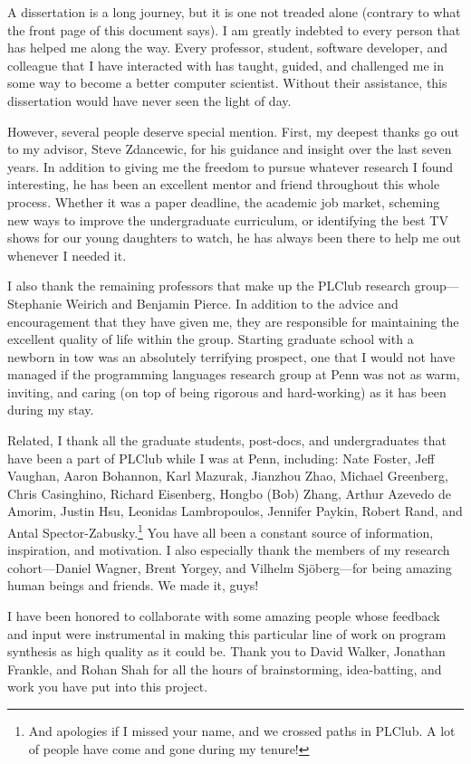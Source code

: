 A dissertation is a long journey, but it is one not treaded alone (contrary to what the front page of this document says).
I am greatly indebted to every person that has helped me along the way.
Every professor, student, software developer, and colleague that I have interacted with has taught, guided, and challenged me in some way to become a better computer scientist.
Without their assistance, this dissertation would have never seen the light of day.

However, several people deserve special mention.
First, my deepest thanks go out to my advisor, Steve Zdancewic, for his guidance and insight over the last seven years.
In addition to giving me the freedom to pursue whatever research I found interesting, he has been an excellent mentor and friend throughout this whole process.
Whether it was a paper deadline, the academic job market, scheming new ways to improve the undergraduate curriculum, or identifying the best TV shows for our young daughters to watch, he has always been there to help me out whenever I needed it.

I also thank the remaining professors that make up the PLClub research group---Stephanie Weirich and Benjamin Pierce.
In addition to the advice and encouragement that they have given me, they are responsible for maintaining the excellent quality of life within the group.
Starting graduate school with a newborn in tow was an absolutely terrifying prospect, one that I would not have managed if the programming languages research group at Penn was not as warm, inviting, and caring (on top of being rigorous and hard-working) as it has been during my stay.

Related, I thank all the graduate students, post-docs, and undergraduates that have been a part of PLClub while I was at Penn, including: Nate Foster, Jeff Vaughan, Aaron Bohannon, Karl Mazurak, Jianzhou Zhao, Michael Greenberg, Chris Casinghino, Richard Eisenberg, Hongbo (Bob) Zhang, Arthur Azevedo de Amorim, Justin Hsu, Leonidas Lambropoulos, Jennifer Paykin, Robert Rand, and Antal Spector-Zabusky.\footnote{%
  And apologies if I missed your name, and we crossed paths in PLClub.
  A lot of people have come and gone during my tenure!
}
You have all been a constant source of information, inspiration, and motivation.
I also especially thank the members of my research cohort---Daniel Wagner, Brent Yorgey, and Vilhelm Sj\"{o}berg---for being amazing human beings and friends.
We made it, guys!

I have been honored to collaborate with some amazing people whose feedback and input were instrumental in making this particular line of work on program synthesis as high quality as it could be.
Thank you to David Walker, Jonathan Frankle, and Rohan Shah for all the hours of brainstorming, idea-batting, and work you have put into this project.

